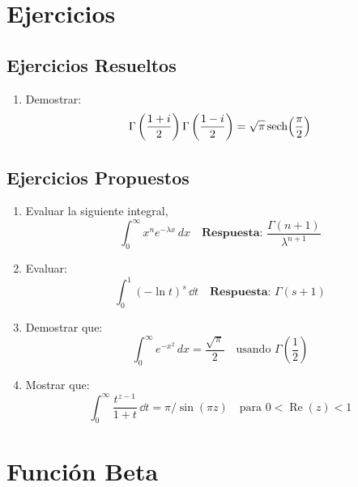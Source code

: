 \section{Ejercicios }

\subsection{Ejercicios Resueltos}
\begin{enumerate}
	\item Demostrar:
	      \[
		      \Gamma\left(\frac{1+i}{2}\right) \Gamma\left(\frac{1-i}{2}\right)= \sqrt{\pi} \sech(\frac{\pi}{2})
	      \]
\end{enumerate}


\subsection{Ejercicios Propuestos}

\begin{enumerate}

	\item Evaluar la siguiente integral,
	      \[
		      \int_0^\infty x^n e^{-\lambda x} \, dx
		      \quad \textbf{Respuesta: } \frac{\Gamma(n+1)}{\lambda^{n+1}}
	      \]

	\item Evaluar:
	      \[
		      \int_0^1 (-\ln t)^s \, \dd{t}
		      \quad \textbf{Respuesta: } \Gamma(s+1)
	      \]

	\item Demostrar que:
	      \[
		      \int_0^\infty e^{-x^2} \, dx = \frac{\sqrt{\pi}}{2}
		      \quad \text{usando } \Gamma\left(\frac{1}{2}\right)
	      \]


	\item Mostrar que:
	      \[
		      \int_0^\infty \frac{t^{z-1}}{1 + t} \, \dd{t} = \pi / \sin(\pi z)
		      \quad \text{para } 0 < \operatorname{Re}(z) < 1
	      \]

\end{enumerate}

\section{Función Beta}

